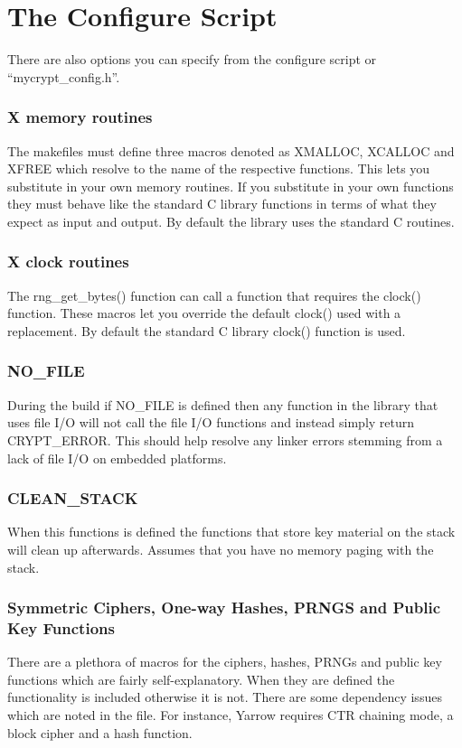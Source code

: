 \documentclass{book}
\begin{document}
\section{The Configure Script}
There are also options you can specify from the configure script or ``mycrypt\_config.h''.  

\subsubsection{X memory routines}
The makefiles must define three macros denoted as XMALLOC, XCALLOC and XFREE which resolve to the name of the respective
functions.  This lets you substitute in your own memory routines.  If you substitute in your own functions they must behave
like the standard C library functions in terms of what they expect as input and output.  By default the library uses the
standard C routines.

\subsubsection{X clock routines}
The rng\_get\_bytes() function can call a function that requires the clock() function.  These macros let you override
the default clock() used with a replacement.  By default the standard C library clock() function is used.

\subsubsection{NO\_FILE}
During the build if NO\_FILE is defined then any function in the library that uses file I/O will not call the file I/O 
functions and instead simply return CRYPT\_ERROR.  This should help resolve any linker errors stemming from a lack of
file I/O on embedded platforms.

\subsubsection{CLEAN\_STACK}
When this functions is defined the functions that store key material on the stack will clean up afterwards.  Assumes that
you have no memory paging with the stack.

\subsubsection{Symmetric Ciphers, One-way Hashes, PRNGS and Public Key Functions}
There are a plethora of macros for the ciphers, hashes, PRNGs and public key functions which are fairly self-explanatory.  
When they are defined the functionality is included otherwise it is not.  There are some dependency issues which are
noted in the file.  For instance, Yarrow requires CTR chaining mode, a block cipher and a hash function.
\end{document}
